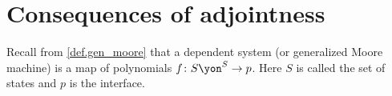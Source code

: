 \documentclass[Book-Poly]{subfiles}
\begin{document}





\section{Consequences of adjointness}


Recall from \cref{def.gen_moore} that a dependent system (or generalized Moore machine) is a map of polynomials $f\colon S\yon^S\to p$. Here $S$ is called the set of states and $p$ is the interface. 
\end{document}
